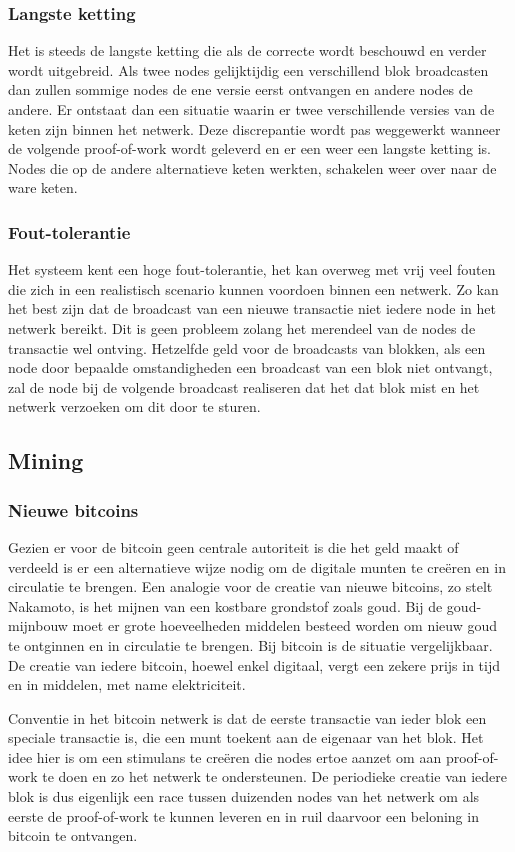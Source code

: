 		\subsubsection{Langste ketting}
		Het is steeds de langste ketting die als de correcte wordt beschouwd en verder wordt uitgebreid. Als twee nodes gelijktijdig een verschillend blok broadcasten dan zullen sommige nodes de ene versie eerst ontvangen en andere nodes de andere. Er ontstaat dan een situatie waarin er twee verschillende versies van de keten zijn binnen het netwerk. Deze discrepantie wordt pas weggewerkt wanneer de volgende proof-of-work wordt geleverd en er een weer een langste ketting is. Nodes die op de andere alternatieve keten werkten, schakelen weer over naar de ware keten.
		\subsubsection{Fout-tolerantie}
		Het systeem kent een hoge fout-tolerantie, het kan overweg met vrij veel fouten die zich in een realistisch scenario  kunnen voordoen binnen een netwerk. Zo kan het best zijn dat de broadcast van een nieuwe transactie niet iedere node in het netwerk bereikt. Dit is geen probleem zolang het merendeel van de nodes de transactie wel ontving. Hetzelfde geld voor de broadcasts van blokken, als een node door bepaalde omstandigheden een broadcast van een blok niet ontvangt, zal de node bij de volgende broadcast realiseren dat het dat blok mist en het netwerk verzoeken om dit door te sturen.
	\subsection{Mining}
		\subsubsection{Nieuwe bitcoins}
		Gezien er voor de bitcoin geen centrale autoriteit is die het geld maakt of verdeeld is er een alternatieve wijze nodig om de digitale munten te creëren en in circulatie te brengen. Een analogie voor de creatie van nieuwe bitcoins, zo stelt Nakamoto, is het mijnen van een kostbare grondstof zoals goud. Bij de goud-mijnbouw moet er grote hoeveelheden middelen besteed worden om nieuw goud te ontginnen en in circulatie te brengen. Bij bitcoin is de situatie vergelijkbaar. De creatie van iedere bitcoin, hoewel enkel digitaal, vergt een zekere prijs in tijd en in middelen, met name elektriciteit.
		
		Conventie in het bitcoin netwerk is dat de eerste transactie van ieder blok een speciale transactie is, die een munt toekent aan de eigenaar van het blok. Het idee hier is om een stimulans te creëren die nodes ertoe aanzet om aan proof-of-work te doen en zo het netwerk te ondersteunen. De periodieke creatie van iedere blok is dus eigenlijk een race tussen duizenden nodes van het netwerk om als eerste de proof-of-work te kunnen leveren en in ruil daarvoor een beloning in bitcoin te ontvangen. 
		

